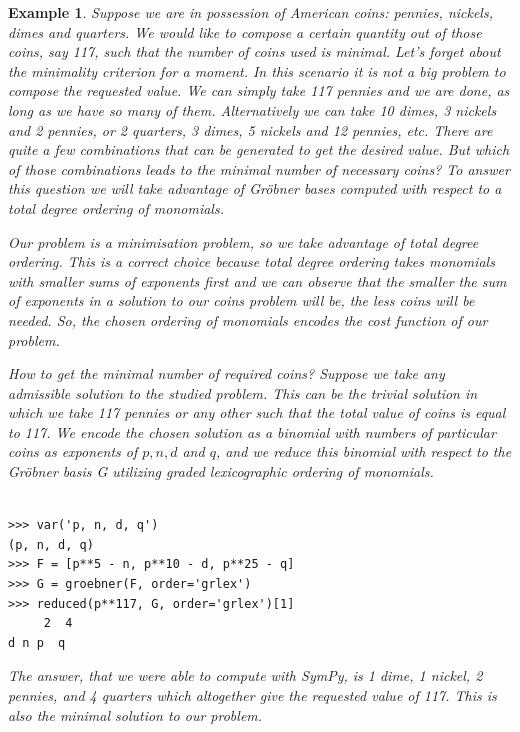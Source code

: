 \documentclass[12pt]{article}
\newtheorem{example}[theorem]{Example}
\begin{document}
\begin{example}
{\rm
Suppose we are in possession of American coins: pennies, nickels,
dimes and quarters. We would like to compose a certain quantity out of
those coins, say 117, such that the number of coins used is
minimal. Let's forget about the minimality criterion for a moment. In
this scenario it is not a big problem to compose the requested
value. We can simply take 117 pennies and we are done, as long as we
have so many of them. Alternatively we can take 10 dimes, 3 nickels
and 2 pennies, or 2 quarters, 3 dimes, 5 nickels and 12 pennies,
etc. There are quite a few combinations that can be generated to get
the desired value. But which of those combinations leads to the
minimal number of necessary coins? To answer this question we will
take advantage of Gr\"obner bases computed with respect to a total
degree ordering of monomials.

Our problem is a minimisation problem, so we take advantage of total
degree ordering. 
This is a correct choice because total degree ordering takes monomials
with smaller sums 
of exponents first and we can observe that the smaller the sum of
exponents in a solution 
to our coins problem will be, the less coins will be needed. So, the
chosen ordering of 
monomials encodes the cost function of our problem.

How to get the minimal number of required coins? Suppose we take any
admissible solution 
to the studied problem. This can be the trivial solution in which we
take 117 pennies or any 
other such that the total value of coins is equal to 117. We encode
the chosen solution as a 
binomial with numbers of particular coins as exponents of $p, n, d$ and
$q$, and we reduce this 
binomial with respect to the Gr\"obner basis G utilizing
graded lexicographic ordering of monomials.


\begin{Verbatim}[fontsize=\scriptsize,fontfamily=courier,fontshape=tt,frame=single,label=SymPy]

>>> var('p, n, d, q')
(p, n, d, q)
>>> F = [p**5 - n, p**10 - d, p**25 - q]
>>> G = groebner(F, order='grlex')
>>> reduced(p**117, G, order='grlex')[1]
     2  4
d n p  q

\end{Verbatim}

\noindent
The answer, that we were able to compute with SymPy, is 1 dime, 1 nickel,
2 pennies, and 4 quarters which altogether give the requested value of 117.
This is also the minimal solution to our problem.

}
\end{example}
\end{document}
